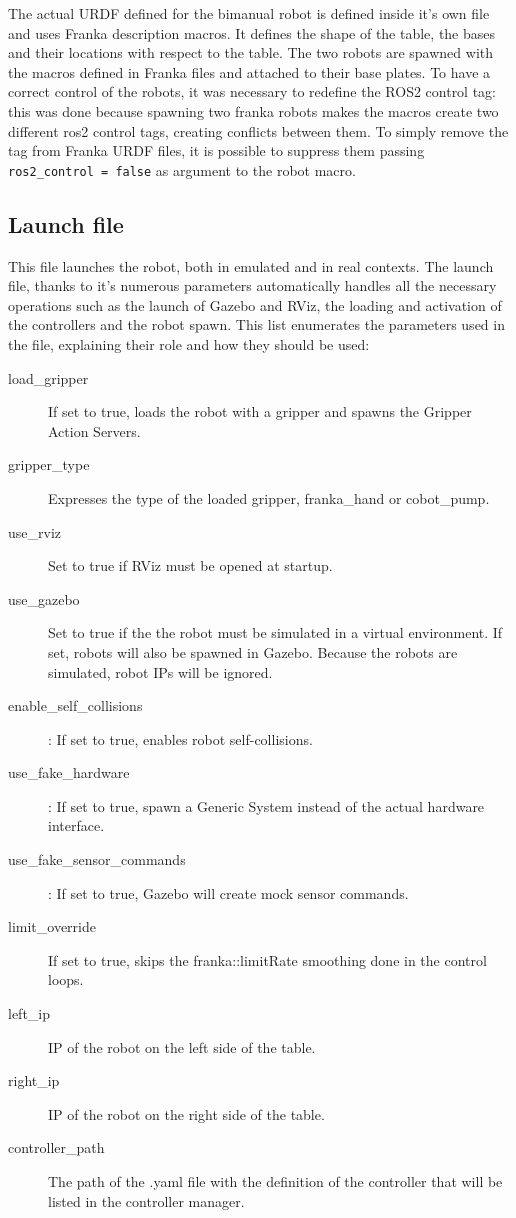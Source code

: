\documentclass{article}
\begin{document}
The actual URDF defined for the bimanual robot is defined inside it's own file and uses Franka description macros. It defines the shape of the table, the bases and their locations with respect to the table. The two robots are spawned with the macros defined in Franka files and attached to their base plates. 
To have a correct control of the robots, it was necessary to redefine the ROS2 control tag: this was done because spawning two franka robots makes the macros create two different ros2 control tags, creating conflicts between them. To simply remove the tag from Franka URDF files, it is possible to suppress them passing \texttt{ros2\_control = false} as argument to the robot macro.

\subsection{Launch file}
This file launches the robot, both in emulated and in real contexts. The launch file, thanks to it's numerous parameters automatically handles all the necessary operations such as the launch of Gazebo and RViz, the loading and activation of the controllers and the robot spawn. This list enumerates the parameters used in the file, explaining their role and how they should be used:
\begin{description}
    \item[load\_gripper] If set to true, loads the robot with a gripper and spawns the Gripper Action Servers.
    \item[gripper\_type] Expresses the type of the loaded gripper, franka\_hand or cobot\_pump.
    \item[use\_rviz] Set to true if RViz must be opened at startup.
    \item[use\_gazebo] Set to true if the the robot must be simulated in a virtual environment. If set, robots will also be spawned in Gazebo. Because the robots are simulated, robot IPs will be ignored.
    \item[enable\_self\_collisions]: If set to true, enables robot self-collisions.
    \item[use\_fake\_hardware]: If set to true, spawn a Generic System instead of the actual hardware interface.
    \item[use\_fake\_sensor\_commands]: If set to true, Gazebo will create mock sensor commands.
    \item[limit\_override] If set to true, skips the franka::limitRate smoothing done in the control loops.
    \item[left\_ip] IP of the robot on the left side of the table.
    \item[right\_ip] IP of the robot on the right side of the table.
    \item[controller\_path] The path of the .yaml file with the definition of the controller that will be listed in the controller manager.
\end{description}
\end{document}
